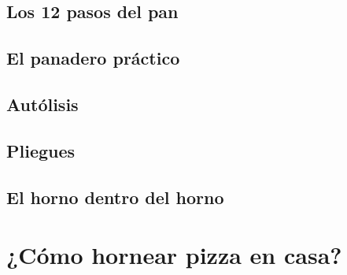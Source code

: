 \documentclass[%
a4paper,
twoside,
14pt
]{book}
\begin{document}
\subsection{Los 12 pasos del pan}
\subsection{El panadero práctico}
\subsection{Autólisis}
\subsection{Pliegues}
\subsection{El horno dentro del horno}
\section{¿Cómo hornear pizza en casa?}
\end{document}
